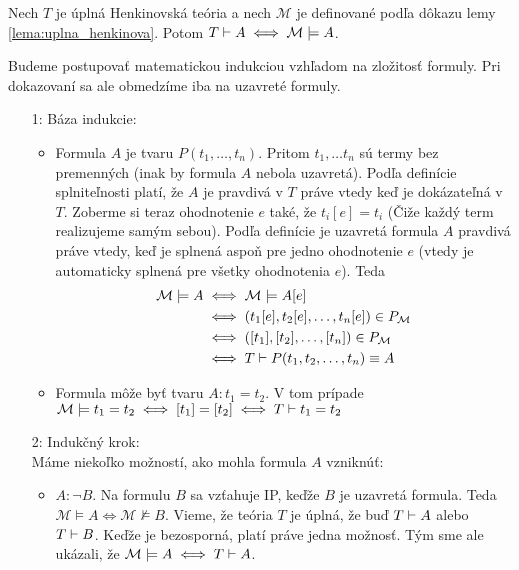 \begin{veta}
    Nech $T$ je úplná Henkinovská teória a nech $\mathcal{M}$ je
    definované podľa dôkazu lemy \ref{lema:uplna_henkinova}.
    Potom $T \vdash A \iff \mathcal{M} \models A$.
\end{veta}

\begin{dokaz}
    Budeme postupovať matematickou indukciou vzhľadom na zložitosť
    formuly. Pri dokazovaní sa ale obmedzíme iba na uzavreté formuly.
    \begin{itemize}
    \item[1:] Báza indukcie:
        \begin{itemize}
        \item Formula $A$ je tvaru $P(t_1,\dots,t_n)$. Pritom $t_1,
            \dots t_n$ sú termy bez premenných (inak by formula $A$
            nebola uzavretá). Podľa definície splniteľnosti platí, že
            $A$ je pravdivá v $T$ práve vtedy keď je dokázateľná v
            $T$. Zoberme si teraz ohodnotenie $e$ také, že
            $t_i[e] = t_i$ (Čiže každý term realizujeme samým sebou).
            Podľa definície je uzavretá formula $A$ pravdivá práve vtedy, 
            keď je splnená aspoň pre jedno ohodnotenie $e$ (vtedy je
            automaticky splnená pre všetky ohodnotenia $e$).
            Teda
            \begin{equation*}
            \begin{split}
                \mathcal{M} \models A 
                &\iff \mathcal{M} \models A[e] \\
                &\iff (t_1[e],t_2[e],\dots,t_n[e]) \in P_\mathcal{M}
                \\
                &\iff ([t_1],[t_2],\dots,[t_n]) \in P_\mathcal{M} \\
                &\iff T \vdash P(t_1,t_2, \dots, t_n) \equiv A
            \end{split}
            \end{equation*}

        \item Formula môže byť tvaru $A:t_1=t_2$. V tom prípade
            $\mathcal{M} \models t_1 = t_2 \iff [t_1]=[t_2] \iff
                T \vdash t_1=t_2$
        \end{itemize}

    \item[2:] Indukčný krok:\\
        Máme niekoľko možností, ako mohla formula $A$ vzniknúť:
        \begin{itemize}
        \item $A:\neg B$. Na formulu $B$ sa vzťahuje IP, keďže $B$ je
            uzavretá formula. Teda
            $\mathcal{M} \models A \iff \mathcal{M} \not \models B$.
            Vieme, že teória $T$ je úplná, že buď $T \vdash A$
            alebo $T \vdash B$. Keďže je bezosporná, platí práve
            jedna možnosť. Tým sme ale ukázali, že
            $\mathcal{M} \models A \iff T \vdash A$.


\end{itemize}
\end{itemize}
\end{dokaz}
